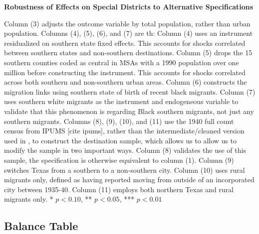 \documentclass{article}
\begin{document}
\begin{landscape}
\begin{table}[ht]
\centering
\caption{\textbf{Robustness of Effects on Special Districts to Alternative Specifications}}
\begin{threeparttable}

\begin{tablenotes}\footnotesize
\item Column (3) adjusts the outcome variable by total population, rather than urban population. Columns (4), (5), (6), and (7) are th: Column (4) uses an instrument residualized on southern state fixed effects. This accounts for shocks correlated between southern states and non-southern destinations. Column (5) drops the 15 southern counties coded as central in MSAs with a 1990 population over one million before constructing the instrument. This accounts for shocks correlated across both southern and non-southern urban areas. Column (6) constructs the migration links using southern state of birth of recent black migrants. Column (7) uses southern white migrants as the instrument and endogeneous variable to validate that this phenomenon is regarding Black southern migrants, not just any southern migrants. Columns (8), (9), (10), and (11) use the 1940 full count census from IPUMS [cite ipums], rather than the intermediate/cleaned version used in , to construct the destination sample, which allows us to allow us to modify the sample in two important ways. Column (8) validates the use of this sample, the specification is otherwise equivalent to column (1). Column (9) switches Texas from a southern to a non-southern city. Column (10) uses rural migrants only, defined as having reported moving from outside of an incorporated city between 1935-40. Column (11) employs both northern Texas and rural migrants only.  * \(p<0.10\), ** \(p<0.05\), *** \(p<0.01\)
\end{tablenotes}
\end{threeparttable}
\label{tab:spdist_insts}
\end{table}
\end{landscape}
\subsection{Balance Table}

\clearpage
\end{document}
